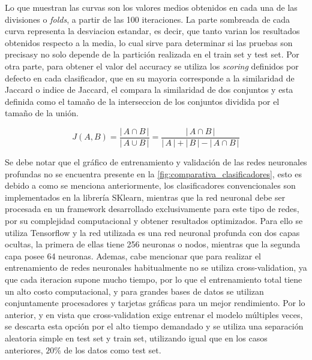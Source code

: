 Lo que muestran las curvas son los valores medios obtenidos en cada una de las divisiones o \textit{folds}, a partir de las 100 iteraciones. La parte sombreada de cada curva representa la desviacion estandar, es decir, que tanto varian los resultados obtenidos respecto a la media, lo cual sirve para determinar si las pruebas son precisasy no solo depende de la partición realizada en el train set y test set. Por otra parte, para obtener el valor del accuracy se utiliza los \textit{scoring} definidos por defecto en cada clasificador, que en su mayoria corresponde a la similaridad de Jaccard o indice de Jaccard, el compara la similaridad de dos conjuntos y esta definida como el tamaño de la interseccion de los conjuntos dividida por el tamaño de la unión.

$$ J(A, B) = \frac{| \, A \cap B \, |}{| \, A \cup B \,|} =  \frac{| \, A \cap B \, |}{|\, A \,| + |\, B \,|  - | \, A \cap B \, |}$$ 

Se debe notar que el gráfico de entrenamiento y validación de las redes neuronales profundas no se encuentra presente en la \autoref{fig:comparativa_clasificadores}, esto es debido a como se menciona anteriormente, los clasificadores convencionales son implementados en la librería SKlearn, mientras que la red neuronal debe ser procesada en un framework desarrollado exclusivamente para este tipo de redes, por su complejidad computacional y obtener resultados optimizados. Para ello se utiliza Tensorflow y la red utilizada es una red neuronal profunda con dos capas ocultas, la primera de ellas tiene 256 neuronas o nodos, mientras que la segunda capa posee 64 neuronas. Ademas, cabe mencionar que para realizar el entrenamiento de redes neuronales habitualmente no se utiliza cross-validation, ya que cada iteracion supone mucho tiempo, por lo que el entrenamiento total tiene un alto costo computacional, y para grandes bases de datos se utilizan conjuntamente procesadores y tarjetas gráficas para un mejor rendimiento. Por lo anterior, y en vista que cross-validation exige entrenar el modelo múltiples veces, se descarta esta opción por el alto tiempo demandado y se utiliza una separación aleatoria simple en test set y train set, utilizando igual que en los casos anteriores, $20\%$ de los datos como test set.

